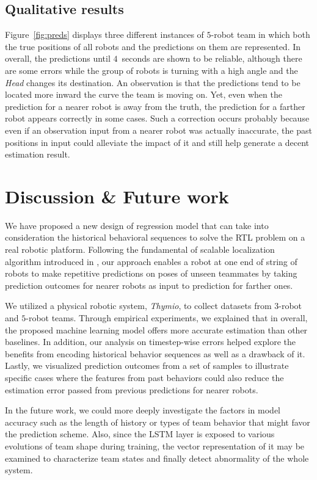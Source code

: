 \documentclass[letterpaper, 10 pt, conference]{ieeeconf}  %
\begin{document}
	\subsection{Qualitative results}
	\label{sec:qualitative_results}

	Figure~\ref{fig:preds} displays three different instances of $5$-robot team
	in which both the true positions of all robots and the predictions on them are represented.
	In overall, the predictions
	until $4$~seconds are shown to be reliable, although there are some errors while the
	group of robots is turning with a high angle and the \emph{Head} changes its destination.
	An observation is that the predictions tend to be located more inward the curve the team is moving on.
	Yet, even when the prediction for a nearer robot is away from the truth, the prediction
	for a farther robot appears correctly in some cases.
	Such a correction occurs probably because even if an observation input from a nearer robot was
	actually inaccurate, the past positions in input could alleviate the impact of it and still
	help generate a decent estimation result.


	\section{Discussion \& Future work}
	\label{sec:discussion_and_future_work}

	We have proposed a new design of regression model that can take into consideration
	the historical behavioral sequences to solve the RTL problem on a real robotic platform.
	Following the fundamental of scalable localization algorithm introduced in \cite{CPR17},
	our approach enables a robot at one end of string of robots to make repetitive predictions
	on poses of unseen teammates by taking prediction outcomes for nearer robots as input to
	prediction for farther ones.

	We utilized a physical robotic system, \emph{Thymio}, to collect datasets from
	$3$-robot and $5$-robot teams. Through empirical experiments, we explained that in overall,
	the proposed machine learning model offers more accurate estimation than other baselines.
	In addition, our analysis on timestep-wise errors helped
	explore the benefits from encoding historical behavior sequences as well as a
	drawback of it. Lastly, we visualized prediction outcomes from a set of samples to
	illustrate specific cases where the features from past behaviors could also reduce the
	estimation error passed from previous predictions for nearer robots.

	In the future work, we could more deeply investigate the factors in model accuracy such as
	the length of history or types of team behavior that might favor the prediction scheme.
	Also, since the LSTM layer is exposed
	to various evolutions of team shape during training, the vector representation of it
	may be examined to characterize team states and finally detect abnormality of the whole
	system.


{\small
	
	
}
\end{document}
